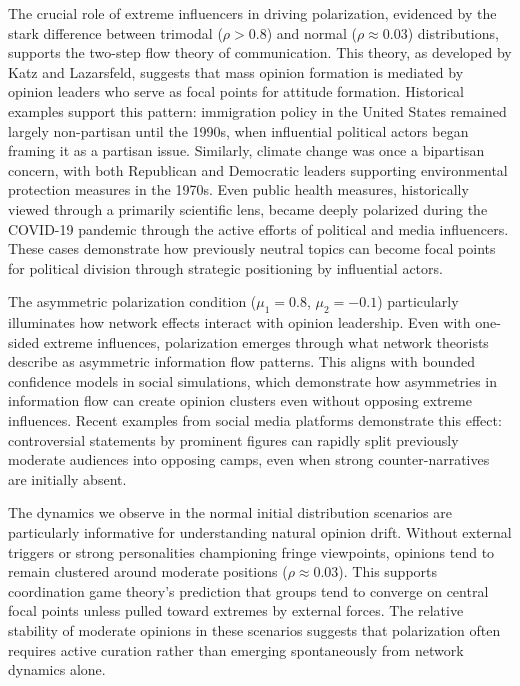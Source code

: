 The crucial role of extreme influencers in driving polarization, evidenced by the stark difference between trimodal ($\rho > 0.8$) and normal ($\rho \approx 0.03$) distributions, supports the two-step flow theory of communication. This theory, as developed by Katz and Lazarsfeld, suggests that mass opinion formation is mediated by opinion leaders who serve as focal points for attitude formation. Historical examples support this pattern: immigration policy in the United States remained largely non-partisan until the 1990s, when influential political actors began framing it as a partisan issue. Similarly, climate change was once a bipartisan concern, with both Republican and Democratic leaders supporting environmental protection measures in the 1970s. Even public health measures, historically viewed through a primarily scientific lens, became deeply polarized during the COVID-19 pandemic through the active efforts of political and media influencers. These cases demonstrate how previously neutral topics can become focal points for political division through strategic positioning by influential actors.

The asymmetric polarization condition ($\mu_1 = 0.8$, $\mu_2 = -0.1$) particularly illuminates how network effects interact with opinion leadership. Even with one-sided extreme influences, polarization emerges through what network theorists describe as asymmetric information flow patterns. This aligns with bounded confidence models in social simulations, which demonstrate how asymmetries in information flow can create opinion clusters even without opposing extreme influences. Recent examples from social media platforms demonstrate this effect: controversial statements by prominent figures can rapidly split previously moderate audiences into opposing camps, even when strong counter-narratives are initially absent.

The dynamics we observe in the normal initial distribution scenarios are particularly informative for understanding natural opinion drift. Without external triggers or strong personalities championing fringe viewpoints, opinions tend to remain clustered around moderate positions ($\rho \approx 0.03$). This supports coordination game theory's prediction that groups tend to converge on central focal points unless pulled toward extremes by external forces. The relative stability of moderate opinions in these scenarios suggests that polarization often requires active curation rather than emerging spontaneously from network dynamics alone.

